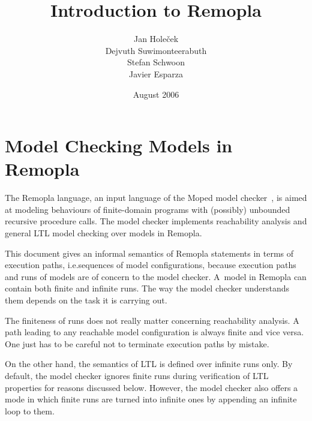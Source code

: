 \documentclass[a4paper,11pt,titlepage,english]{article}
\begin{document}
\title{\Huge\bfseries Introduction to Remopla}
\author{
    Jan Hole\v{c}ek\\
    Dejvuth Suwimonteerabuth\\
    Stefan Schwoon\\
    Javier Esparza}
\date{August 2006}
{\let\large=\Large
\maketitle
}

\tableofcontents
\clearpage

\section{Model Checking Models in Remopla\label{s:modelchecking}}


The Remopla language, an input language of the Moped model
checker~\cite{Schwoon02}, is aimed at modeling behaviours of finite-domain
programs with (possibly) unbounded recursive procedure calls. The model
checker implements reachability analysis and general LTL model checking
over models in Remopla.

This document gives an informal semantics of Remopla statements in terms of
execution paths, i.e.\@ sequences of model configurations, because
execution paths and runs of models are of concern to the model checker.
A~model in Remopla can contain both finite and infinite runs.  The way the
model checker understands them depends on the task it is carrying out.

The finiteness of runs does not really matter concerning reachability
analysis. A path leading to any reachable model configuration is always
finite and vice versa. One just has to be careful not to terminate
execution paths by mistake.

On the other hand, the semantics of LTL is defined over infinite runs only.
By default, the model checker ignores finite runs during verification of
LTL properties for reasons discussed below. However, the model checker also
offers a mode in which finite runs are turned into infinite ones by
appending an infinite loop to them.
\end{document}
